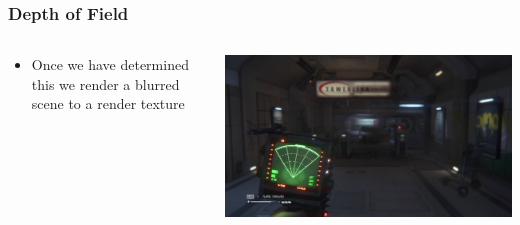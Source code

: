 \begin{frame}
	\frametitle{Depth of Field}
	\begin{columns}
		\begin{column}{0.5\textwidth}
			\begin{itemize}
				\item Once we have determined this we render a blurred scene to a render texture
			\end{itemize}
		\end{column}
		\begin{column}{0.5\textwidth} 
			\begin{center}
				\includegraphics[width=\textwidth]{depth_of_field}
			\end{center}
		\end{column}
	\end{columns}	
\end{frame}

